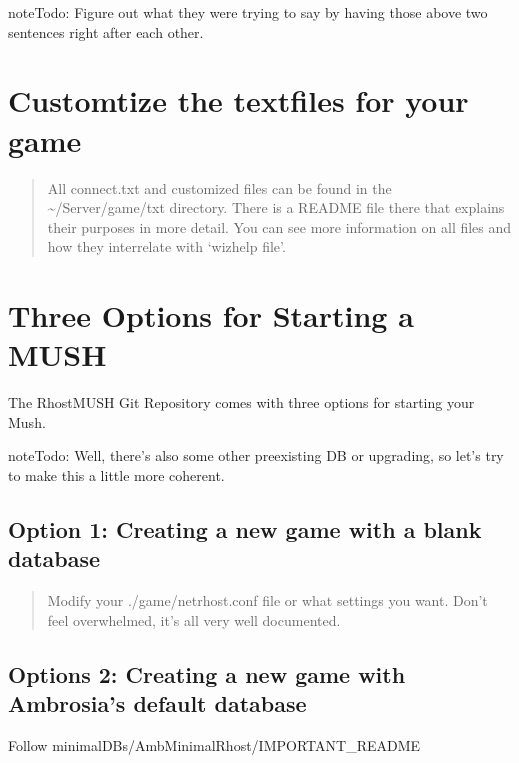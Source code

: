 \documentclass[letterpaper,10pt,english]{sphinxmanual}
\begin{document}
\begin{sphinxadmonition}{note}{\label{\detokenize{install:id7}}Todo:}
\sphinxAtStartPar
Figure out what they were trying to say by having those above two sentences right after each other.
\end{sphinxadmonition}


\section{Customtize the textfiles for your game}
\label{\detokenize{install:customtize-the-textfiles-for-your-game}}\begin{quote}

\sphinxAtStartPar
All connect.txt and customized files can be found in the \textasciitilde{}/Server/game/txt directory.  There is a
README file there that explains their purposes in more detail.  You can see more information on
all files and how they inter\sphinxhyphen{}relate with ‘wizhelp file’.
\end{quote}


\section{Three Options for Starting a MUSH}
\label{\detokenize{install:three-options-for-starting-a-mush}}
\sphinxAtStartPar
The RhostMUSH Git Repository comes with three options for starting your Mush.

\begin{sphinxadmonition}{note}{\label{\detokenize{install:id8}}Todo:}
\sphinxAtStartPar
Well, there’s also some other pre\sphinxhyphen{}existing DB or upgrading, so let’s try to make this a little more coherent.
\end{sphinxadmonition}


\subsection{Option 1: Creating a new game with a blank database}
\label{\detokenize{install:option-1-creating-a-new-game-with-a-blank-database}}\begin{quote}

\sphinxAtStartPar
Modify your ./game/netrhost.conf file or what settings you want.
Don’t feel overwhelmed, it’s all very well documented.
\end{quote}


\subsection{Options 2: Creating a new game with Ambrosia’s default database}
\label{\detokenize{install:options-2-creating-a-new-game-with-ambrosia-s-default-database}}
\sphinxAtStartPar
Follow minimal\sphinxhyphen{}DBs/Amb\sphinxhyphen{}MinimalRhost/IMPORTANT\_README
\end{document}
